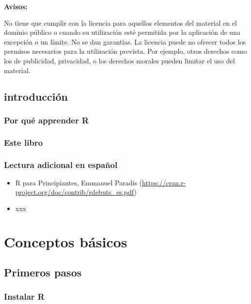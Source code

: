 \documentclass[]{book}
\providecommand{\tightlist}{%
  \setlength{\itemsep}{0pt}\setlength{\parskip}{0pt}}
\begin{document}
\textbf{Avisos: }

No tiene que cumplir con la licencia para aquellos elementos del
material en el dominio público o cuando su utilización esté permitida
por la aplicación de una excepción o un límite. No se dan garantías. La
licencia puede no ofrecer todos los permisos necesarios para la
utilización prevista. Por ejemplo, otros derechos como los de
publicidad, privacidad, o los derechos morales pueden limitar el uso del
material.

\chapter{introducción}\label{intro}

\section{Por qué apprender R}\label{por-que-apprender-r}

\section{Este libro}\label{este-libro}

\section{Lectura adicional en
español}\label{lectura-adicional-en-espanol}

\begin{itemize}
\tightlist
\item
  R para Principiantes, Emmanuel Paradis
  (\url{https://cran.r-project.org/doc/contrib/rdebuts_es.pdf})
\item
  xxx
\end{itemize}

\part{Conceptos básicos}\label{part-conceptos-basicos}

\chapter{Primeros pasos}\label{premiersPas}

\section{Instalar R}\label{instalar-r}
\end{document}
